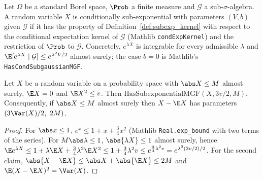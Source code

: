 \begin{definition}\label{def:subexp_cond}
\leanok
{}
Let $\Omega$ be a standard Borel space, $\Prob$ a finite measure and $\mathcal G$ a
sub-$\sigma$-algebra. A random variable $X$ is conditionally sub-exponential with parameters
$(V,b)$ given $\mathcal G$ if it has the property of Definition~\ref{def:subexp_kernel} with
respect to the conditional expectation kernel of $\mathcal G$ (Mathlib
\texttt{condExpKernel}) and the restriction of $\Prob$ to $\mathcal G$. Concretely,
$e^{\lambda X}$ is integrable for every admissible $\lambda$ and
$\E[e^{\lambda X}\mid\mathcal G] \le e^{\lambda^2V/2}$ almost surely; the case $b = 0$ is
Mathlib's \texttt{HasCondSubgaussianMGF}.
\end{definition}

\begin{lemma}\label{lem:bernstein_condition}
\leanok
{}
Let $X$ be a random variable on a probability space with $\abs X \le M$ almost surely,
$\E X = 0$ and $\E X^2 \le v$. Then $\mathrm{HasSubexponentialMGF}(X, 3v/2, M)$.
Consequently, if $\abs X \le M$ almost surely then $X - \E X$ has parameters
$(3\Var(X)/2,\ 2M)$.
\end{lemma}

\begin{proof}
\leanok
{}
For $\abs x \le 1$, $e^x \le 1 + x + \frac34x^2$ (Mathlib \texttt{Real.exp\_bound} with two
terms of the series). For $M\abs\lambda \le 1$, $\abs{\lambda X} \le 1$ almost surely, hence
$\E e^{\lambda X} \le 1 + \lambda\E X + \frac34\lambda^2\E X^2 \le 1 + \frac34\lambda^2 v
\le e^{\frac34\lambda^2v} = e^{\lambda^2(3v/2)/2}$. For the second claim,
$\abs{X - \E X} \le \abs X + \abs{\E X} \le 2M$ and $\E(X-\E X)^2 = \Var(X)$.
\end{proof}

